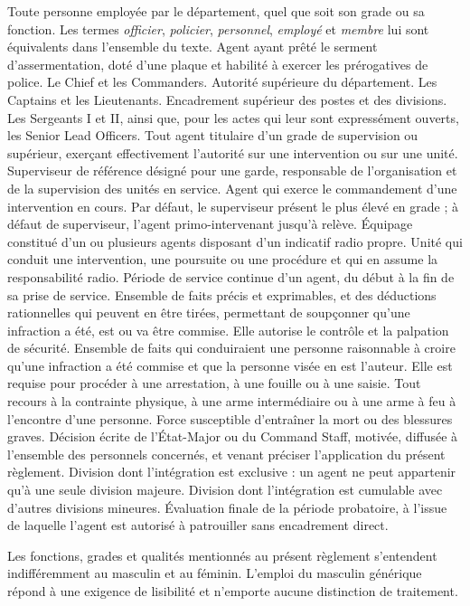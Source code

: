 

\begin{definitions}
 Toute personne employée par le département, quel que soit son grade ou sa fonction. Les termes \emph{officier}, \emph{policier}, \emph{personnel}, \emph{employé} et \emph{membre} lui sont équivalents dans l'ensemble du texte.
 Agent ayant prêté le serment d'assermentation, doté d'une plaque et habilité à exercer les prérogatives de police.
 Le Chief et les Commanders. Autorité supérieure du département.
 Les Captains et les Lieutenants. Encadrement supérieur des postes et des divisions.
 Les Sergeants I et II, ainsi que, pour les actes qui leur sont expressément ouverts, les Senior Lead Officers.
 Tout agent titulaire d'un grade de supervision ou supérieur, exerçant effectivement l'autorité sur une intervention ou sur une unité.
 Superviseur de référence désigné pour une garde, responsable de l'organisation et de la supervision des unités en service.
 Agent qui exerce le commandement d'une intervention en cours. Par défaut, le superviseur présent le plus élevé en grade ; à défaut de superviseur, l'agent primo-intervenant jusqu'à relève.
 Équipage constitué d'un ou plusieurs agents disposant d'un indicatif radio propre.
 Unité qui conduit une intervention, une poursuite ou une procédure et qui en assume la responsabilité radio.
 Période de service continue d'un agent, du début à la fin de sa prise de service.
 Ensemble de faits précis et exprimables, et des déductions rationnelles qui peuvent en être tirées, permettant de soupçonner qu'une infraction a été, est ou va être commise. Elle autorise le contrôle et la palpation de sécurité.
 Ensemble de faits qui conduiraient une personne raisonnable à croire qu'une infraction a été commise et que la personne visée en est l'auteur. Elle est requise pour procéder à une arrestation, à une fouille ou à une saisie.
 Tout recours à la contrainte physique, à une arme intermédiaire ou à une arme à feu à l'encontre d'une personne.
 Force susceptible d'entraîner la mort ou des blessures graves.
 Décision écrite de l'État-Major ou du Command Staff, motivée, diffusée à l'ensemble des personnels concernés, et venant préciser l'application du présent règlement.
 Division dont l'intégration est exclusive : un agent ne peut appartenir qu'à une seule division majeure.
 Division dont l'intégration est cumulable avec d'autres divisions mineures.
 Évaluation finale de la période probatoire, à l'issue de laquelle l'agent est autorisé à patrouiller sans encadrement direct.
\end{definitions}

\begin{note}
Les fonctions, grades et qualités mentionnés au présent règlement s'entendent indifféremment au masculin et au féminin. L'emploi du masculin générique répond à une exigence de lisibilité et n'emporte aucune distinction de traitement.
\end{note}

